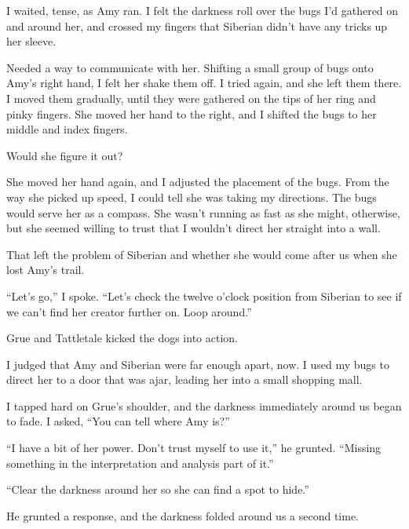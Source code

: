 I waited, tense, as Amy ran.  I felt the darkness roll over the bugs I'd gathered on and around her, and crossed my fingers that Siberian didn't have any tricks up her sleeve.



Needed a way to communicate with her.  Shifting a small group of bugs onto Amy's right hand, I felt her shake them off.  I tried again, and she left them there.  I moved them gradually, until they were gathered on the tips of her ring and pinky fingers.  She moved her hand to the right, and I shifted the bugs to her middle and index fingers.



Would she figure it out?



She moved her hand again, and I adjusted the placement of the bugs.  From the way she picked up speed, I could tell she was taking my directions.  The bugs would serve her as a compass.  She wasn't running as fast as she might, otherwise, but she seemed willing to trust that I wouldn't direct her straight into a wall.



That left the problem of Siberian and whether she would come after us when she lost Amy's trail.



``Let's go,'' I spoke.  ``Let's check the twelve o'clock position from Siberian to see if we can't find her creator further on.  Loop around.''



Grue and Tattletale kicked the dogs into action.



I judged that Amy and Siberian were far enough apart, now.  I used my bugs to direct her to a door that was ajar, leading her into a small shopping mall.



I tapped hard on Grue's shoulder, and the darkness immediately around us began to fade.  I asked, ``You can tell where Amy is?''



``I have a bit of her power.  Don't trust myself to use it,'' he grunted.  ``Missing something in the interpretation and analysis part of it.''



``Clear the darkness around her so she can find a spot to hide.''



He grunted a response, and the darkness folded around us a second time.



